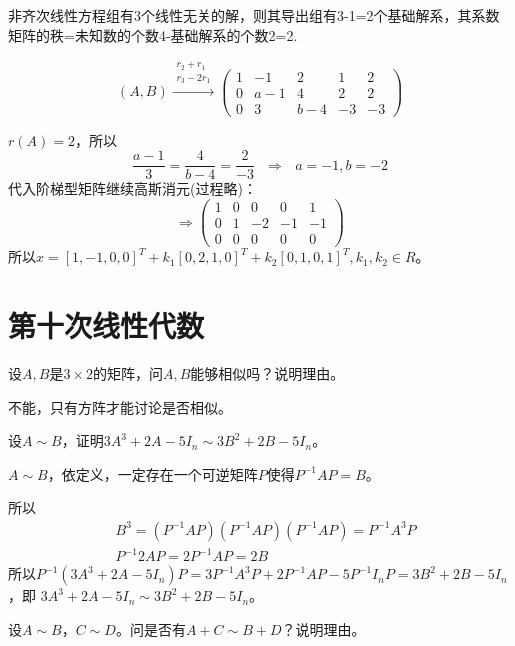 \documentclass[a4paper]{report}
\begin{document}
\begin{jie}
非齐次线性方程组有3个线性无关的解，则其导出组有3-1=2个基础解系，其系数矩阵的秩=未知数的个数4-基础解系的个数2=2.

\begin{equation*}
(A,B)
\xrightarrow{\substack{r_{2}+r_{1}\\ r_3-2r_1}}
{\begin{pmatrix}
1&-1&2&1&2\\
0&a-1&4&2&2\\
0&3&b-4&-3&-3\end{pmatrix}
}
\end{equation*}

$r(A)=2$，所以
\begin{equation*}
\frac{a-1}{3}=\frac{4}{b-4}=\frac{2}{-3}~~~\Rightarrow~~~a=-1,b=-2
\end{equation*}
代入阶梯型矩阵继续高斯消元(过程略)：
\begin{equation*}
\Rightarrow
\begin{pmatrix}
1&0&0&0&1\\
0&1&-2&-1&-1\\
0&0&0&0&0
\end{pmatrix}
\end{equation*}
所以$x=[1,-1,0,0]^T+k_{1}[0,2,1,0]^T+k_2[0,1,0,1]^T,k_1,k_2\in R$。
\end{jie}

\chapter{第十次线性代数}
\EX 设$A,B$是$3\times2$的矩阵，问$A,B$能够相似吗？说明理由。

\begin{jie}
不能，只有方阵才能讨论是否相似。
\end{jie}

\EX 设$A\sim B$，证明$3A^3+2A-5I_{n}\sim 3B^2+2B-5I_n$。

\begin{zhengming}
$A\sim B$，依定义，一定存在一个可逆矩阵$P$使得$P^{-1}AP=B$。

所以
\begin{align*}
&B^3=(P^{-1}AP)(P^{-1}AP)(P^{-1}AP)=P^{-1}A^3P\\
&P^{-1}2AP=2P^{-1}AP=2B
\end{align*}
所以$P^{-1}(3A^3+2A-5I_{n})P=3P^{-1}A^3P+2P^{-1}AP-5P^{-1}I_nP=3B^2+2B-5I_n$，即
$3A^3+2A-5I_{n}\sim 3B^2+2B-5I_n$。
\end{zhengming}

\EX 设$A\sim B$，$C\sim D$。问是否有$A+C\sim B+D$？说明理由。
\end{document}

